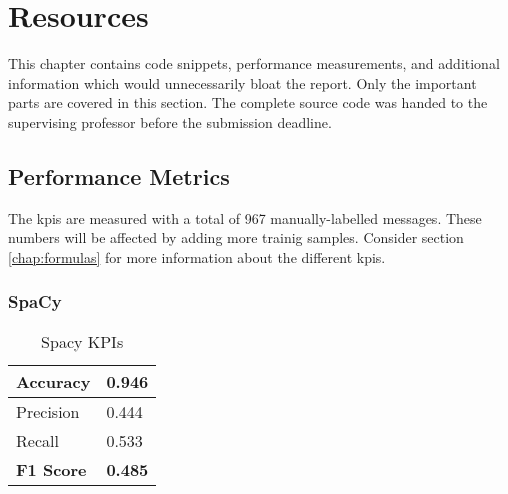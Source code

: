 \chapter{Resources}

This chapter contains code snippets, performance measurements, and additional information which would unnecessarily bloat the report. Only the important parts are covered in this section. The complete source code was handed to the supervising professor before the submission deadline.

\section{Performance Metrics}

The \acrlong{kpi}s are measured with a total of 967 manually-labelled messages. These numbers will be affected by adding more trainig samples. Consider section \ref{chap:formulas} for more information about the different \acrshort{kpi}s.

\subsection{SpaCy}

\begin{table}[ht!]
    \centering
    \begin{tabular}{|p{6em}|p{3em}|}
        \hline
        Accuracy & 0.946 \\
        \hline
        Precision & 0.444 \\
        \hline
        Recall & 0.533 \\
        \hline
        \textbf{F1 Score} & \textbf{0.485} \\
        \hline
    \end{tabular}
    \caption{Spacy KPIs}
    \label{tbl:perf-spacy}
\end{table}

